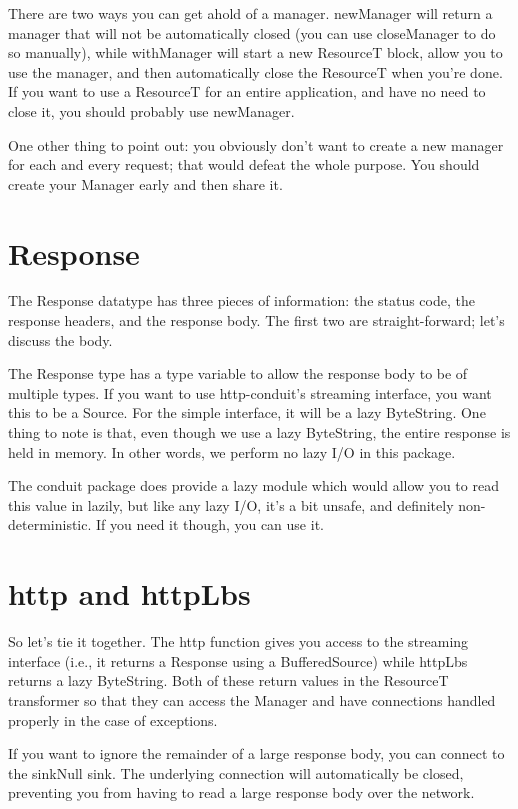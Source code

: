 There are two ways you can get ahold of a manager. newManager will
return a manager that will not be automatically closed (you can use
closeManager to do so manually), while withManager will start a new
ResourceT block, allow you to use the manager, and then automatically
close the ResourceT when you're done. If you want to use a ResourceT
for an entire application, and have no need to close it, you should
probably use newManager.

One other thing to point out: you obviously don't want to create a new
manager for each and every request; that would defeat the whole
purpose. You should create your Manager early and then share it.

\section{Response}

The Response datatype has three pieces of information: the status
code, the response headers, and the response body. The first two are
straight-forward; let's discuss the body.

The Response type has a type variable to allow the response body to be
of multiple types. If you want to use http-conduit's streaming
interface, you want this to be a Source. For the simple interface, it
will be a lazy ByteString. One thing to note is that, even though we
use a lazy ByteString, the entire response is held in memory. In other
words, we perform no lazy I/O in this package.

The conduit package does provide a lazy module which would allow you
to read this value in lazily, but like any lazy I/O, it's a bit
unsafe, and definitely non-deterministic. If you need it though, you
can use it.

\section{http and httpLbs}

So let's tie it together. The http function gives you access to the
streaming interface (i.e., it returns a Response using a
BufferedSource) while httpLbs returns a lazy ByteString. Both of these
return values in the ResourceT transformer so that they can access the
Manager and have connections handled properly in the case of
exceptions.

If you want to ignore the remainder of a large response body, you can
connect to the sinkNull sink. The underlying connection will
automatically be closed, preventing you from having to read a large
response body over the network.
